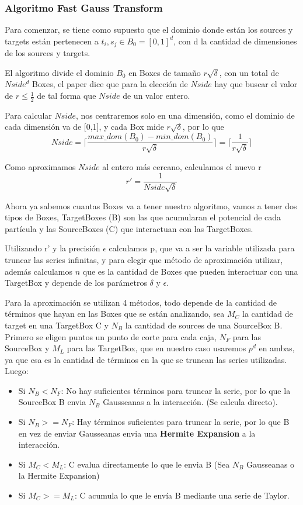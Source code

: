 \documentclass[letter, 10pt]{article}
\begin{document}
\subsubsection{Algoritmo Fast Gauss Transform}
Para comenzar, se tiene como supuesto que el dominio donde están los sources y targets están pertenecen a $t_i,s_j \in B_0 = [0,1]^d$, con d la cantidad de dimensiones de los sources y targets.

El algoritmo divide el dominio $B_0$ en Boxes de tamaño $r\sqrt{\delta}$, con un total de $Nside^d$ Boxes, el paper dice que para la elección de $Nside$ hay que buscar el valor de $r \leq \frac{1}{2}$ de tal forma que $Nside$ de un valor entero.

Para calcular $Nside$, nos centraremos solo en una dimensión, como el dominio de cada dimensión va de [0,1], y cada Box mide $r\sqrt{\delta}$, por lo que 
$$Nside = \lceil{\frac{max\_dom(B_0) - min\_dom(B_0)}{r\sqrt{\delta}}\rceil} = \lceil{\frac{1}{r\sqrt{\delta}}\rceil}$$

Como aproximamos $Nside$ al entero más cercano, calculamos el nuevo r
$$ r' = \frac{1}{Nside \sqrt{\delta}}$$

Ahora ya sabemos cuantas Boxes va a tener nuestro algoritmo, vamos a tener dos tipos de Boxes, TargetBoxes (B) son las que acumularan el potencial de cada partícula y  las SourceBoxes (C) que interactuan con las TargetBoxes. 

Utilizando r' y la precisión $\epsilon$ calculamos p, que va a ser la variable utilizada para truncar las series infinitas, y para elegir que método de aproximación utilizar, además calculamos $n$ que es la cantidad de Boxes que pueden interactuar con una TargetBox y depende de los parámetros $\delta$ y $\epsilon$.

Para la aproximación se utilizan 4 métodos, todo depende de la cantidad de términos que hayan en las Boxes que se están analizando, sea $M_C$ la cantidad de target en una TargetBox C y $N_B$ la cantidad de sources de una SourceBox B. Primero se eligen puntos un punto de corte para cada caja, $N_F$ para las SourceBox y $M_L$ para las TargetBox, que en nuestro caso usaremos $p^d$ en ambas, ya que esa es la cantidad de términos en la que se truncan las series utilizadas. Luego:
\begin{itemize}
\item Si $N_B < N_F$: No hay suficientes términos para truncar la serie, por lo que la SourceBox B envia $N_B$ Gausseanas a la interacción. (Se calcula directo).
\item Si $N_B >= N_F$: Hay términos suficientes para truncar la serie, por lo que B en vez de enviar Gausseanas envia una \textbf{Hermite Expansion} a la interacción.

\item Si $M_C < M_L$: C evalua directamente lo que le envia B (Sea $N_B$ Gausseanas o la Hermite Expansion)

\item Si $M_C >= M_L$: C acumula lo que le envía B mediante una serie de Taylor.
\end{itemize}
\end{document}
